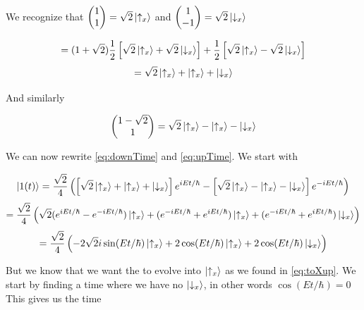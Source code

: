\documentclass[a4paper,norsk, 10pt]{article}
\begin{document}
We recognize that $\begin{pmatrix} 1\\1 \end{pmatrix} = \sqrt{2}\ket{\uparrow_x}$ and $\begin{pmatrix} 1\\-1 \end{pmatrix} = \sqrt{2}\ket{\downarrow_x}$


\begin{equation}
= (1+\sqrt{2})
\frac{1}{2}\left[
\sqrt{2}\ket{\uparrow_x}
+\sqrt{2}\ket{\downarrow_x}
\right]
+
\frac{1}{2}
\left[
\sqrt{2}\ket{\uparrow_x}
-\sqrt{2}\ket{\downarrow_x}
\right]
\end{equation}
\begin{equation}
= \sqrt{2}\ket{\uparrow_x} + \ket{\uparrow_x} + \ket{\downarrow_x}
\end{equation}

And similarly

\begin{equation}
\begin{pmatrix}
1 - \sqrt{2} \\ 1
\end{pmatrix}
= \sqrt{2}\ket{\uparrow_x} - \ket{\uparrow_x} - \ket{\downarrow_x}
\end{equation}


We can now rewrite \eqref{eq:downTime} and \eqref{eq:upTime}. We start with

\begin{equation}
\ket{1(t)} = \frac{\sqrt{2}}{4}\left(\left[\sqrt{2}\ket{\uparrow_x} + \ket{\uparrow_x} + \ket{\downarrow_x}\right] e^{iEt/\hbar} - \left[\sqrt{2}\ket{\uparrow_x} - \ket{\uparrow_x} - \ket{\downarrow_x}\right]e^{-iEt/\hbar}\right)
\end{equation}
\begin{equation}
= \frac{\sqrt{2}}{4}\left(\sqrt{2}(e^{iEt/\hbar}- e^{-iEt/\hbar})\ket{\uparrow_x} + (e^{-iEt/\hbar}+ e^{iEt/\hbar})\ket{\uparrow_x} + (e^{-iEt/\hbar}+ e^{iEt/\hbar})\ket{\downarrow_x}\right)
\end{equation}
\begin{equation}
=\frac{\sqrt{2}}{4}\left(-2\sqrt{2}i\sin(Et/\hbar)\ket{\uparrow_x} + 2\cos(Et/\hbar)\ket{\uparrow_x} +2 \cos(Et/\hbar)\ket{\downarrow_x}\right)
\end{equation}

But we know that we want the to evolve into $\ket{\uparrow_x}$ as we found in \eqref{eq:toXup}. We start by finding a time where we have no $\ket{\downarrow_x}$, in other words $\cos(Et/\hbar) = 0$ This gives us the time
\end{document}
